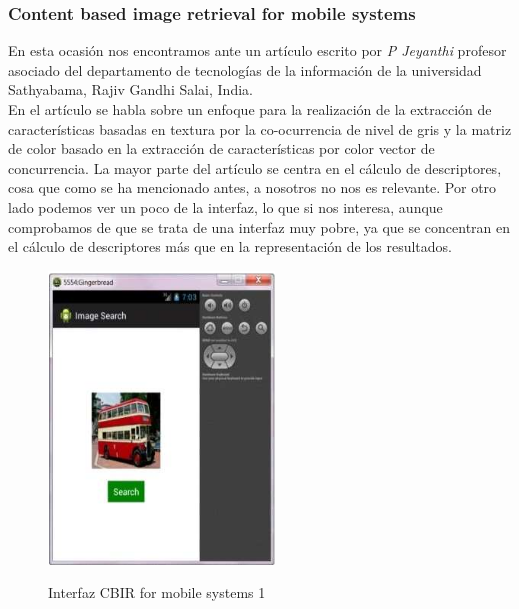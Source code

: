 \subsubsection{Content based image retrieval for mobile systems}

En esta ocasión nos encontramos ante un artículo escrito por \textit{P Jeyanthi} profesor asociado del departamento de tecnologías de la información de la universidad Sathyabama, Rajiv Gandhi Salai, India.\\

En el artículo se habla sobre un enfoque para la realización de la extracción de características basadas en textura por la co-ocurrencia de nivel de gris y la matriz de color basado en la extracción de características por color vector de concurrencia. La mayor parte del artículo se centra en el cálculo de descriptores, cosa que como se ha mencionado antes, a nosotros no nos es relevante. Por otro lado podemos ver un poco de la interfaz, lo que si nos interesa, aunque comprobamos de que se trata de una interfaz muy pobre, ya que se concentran en el cálculo de descriptores más que en la representación de los resultados.


\begin{figure}[H] %
\centering
\includegraphics[scale=0.6]{imagenes/articulo11.png}  %
\label{articulo11}
\caption{Interfaz CBIR for mobile systems 1}
\end{figure}

